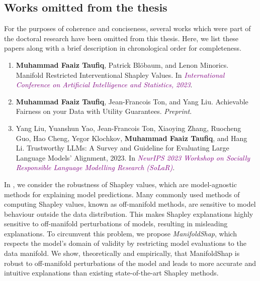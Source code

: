 \subsection{Works omitted from the thesis}
For the purposes of coherence and conciseness, several works which were part of the doctoral research have been omitted from this thesis. 
Here, we list these papers along with a brief description in chronological order for completeness. 
\begin{enumerate}
    \item \textbf{Muhammad Faaiz Taufiq}, Patrick Blöbaum, and Lenon Minorics. Manifold Restricted
    Interventional Shapley Values. In \textit{\textcolor{purple}{International Conference on Artificial Intelligence and
    Statistics, 2023}}.  \citep{taufiq2023manifold}
    \item  \textbf{Muhammad Faaiz Taufiq}, Jean-Francois Ton, and Yang Liu. Achievable Fairness on your Data
    with Utility Guarantees. \textit{Preprint}. \citep{taufiq2024achievablefairnessdatautility}
    \item Yang Liu, Yuanshun Yao, Jean-Francois Ton, Xiaoying Zhang, Ruocheng Guo, Hao Cheng, Yegor
    Klochkov, \textbf{Muhammad Faaiz Taufiq}, and Hang Li. 
    Trustworthy LLMs: A Survey and Guideline for Evaluating Large Language Models' Alignment, 2023. 
    In \textit{\textcolor{purple}{NeurIPS 2023 Workshop on Socially Responsible Language Modelling Research (SoLaR)}}.    
    \citep{liu2024trustworthyllmssurveyguideline}
\end{enumerate}
In \cite{taufiq2023manifold}, we consider the robustness of Shapley values, which are model-agnostic methods for explaining model predictions.
Many commonly used methods of computing Shapley values, known as off-manifold methods, are sensitive to model behaviour outside the data distribution.
This makes Shapley explanations highly sensitive to off-manifold perturbations of models, resulting in misleading explanations.
To circumvent this problem, we propose \emph{ManifoldShap}, which respects the model’s domain of validity by restricting model evaluations to the data manifold.
We show, theoretically and empirically, that ManifoldShap is robust to off-manifold perturbations of the model and leads to
more accurate and intuitive explanations than existing state-of-the-art Shapley methods.

